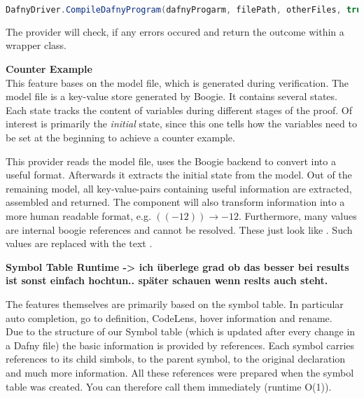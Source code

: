 \begin{lstlisting}[language=csharp, caption={Calling the Dafny Compiler}, captionpos=b, label={lst:dafnycompiler}]
DafnyDriver.CompileDafnyProgram(dafnyProgarm, filePath, otherFiles, true, textwriter);
\end{lstlisting}

The provider will check, if any errors occured and return the outcome within a wrapper class.

\textbf{Counter Example}\\
This feature bases on the model file, which is generated during verification.
The model file is a key-value store generated by Boogie.
It contains several states.
Each state tracks the content of variables during different stages of the proof.
Of interest is primarily the \textit{initial} state, since this one tells how the variables need to be set at the beginning to achieve a counter example.

This provider reads the model file, uses the Boogie backend to convert into a useful format.
Afterwards it extracts the initial state from the model.
Out of the remaining model, all key-value-pairs containing useful information are extracted, assembled and returned.
The component will also transform information into a more human readable format, e.g. $((- 12)) \rightarrow -12$.
Furthermore, many values are internal boogie references and cannot be resolved.
These just look like .
Such values are replaced with the text .











\textbf{Symbol Table Runtime -> ich überlege grad ob das besser bei results ist sonst einfach hochtun.. später schauen wenn reslts auch steht.}

The features themselves are primarily based on the symbol table.
In particular auto completion, go to definition, CodeLens, hover information and rename. \\

Due to the structure of our Symbol table (which is updated after every change in a Dafny file)
the basic information is provided by references.
Each symbol carries references to its child simbols, to the parent symbol, to the original declaration and much more information.
All these references were prepared when the symbol table was created.
You can therefore call them immediately (runtime O(1)).  

